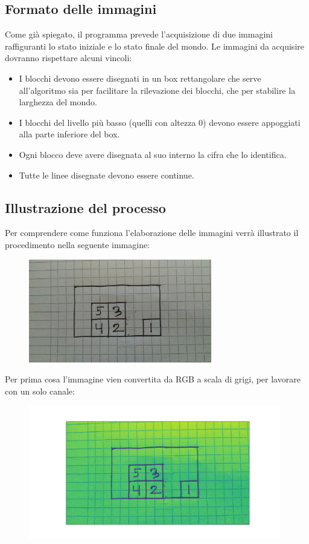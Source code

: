 \documentclass{article}
\begin{document}
	\subsection{Formato delle immagini}
	Come già spiegato, il programma prevede l'acquisizione di due immagini raffiguranti lo stato iniziale e lo stato finale del mondo. Le immagini da acquisire dovranno rispettare alcuni vincoli:
	\begin{itemize}
		\item I blocchi devono essere disegnati in un box rettangolare che serve all'algoritmo sia per facilitare la rilevazione dei blocchi, che per stabilire la larghezza del mondo.
		\item I blocchi del livello più basso (quelli con altezza 0) devono essere appoggiati alla parte inferiore del box.
		\item Ogni blocco deve avere disegnata al suo interno la cifra che lo identifica.
		\item Tutte le linee disegnate devono essere continue.
	\end{itemize}
	
	\subsection{Illustrazione del processo}

	Per comprendere come funziona l'elaborazione delle immagini verrà illustrato il procedimento nella seguente immagine:\\
	
	\begin{figure}[H]
		\centering
		\includegraphics[width=8cm]{./images/immagine_test.jpg}
	\end{figure}


	\noindent Per prima cosa l'immagine vien convertita da RGB a scala di grigi, per lavorare con un solo canale:
	
	\begin{figure}[H]
		\centering
		\includegraphics[width=11cm]{./images/immagine_test_gray.png}
	\end{figure}
	
\end{document}
